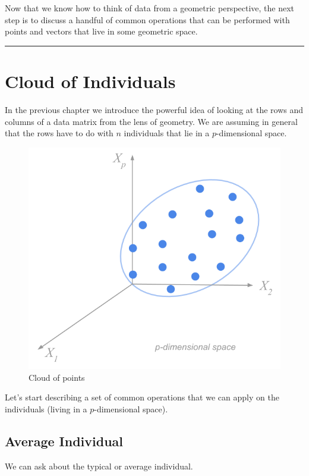 \documentclass[]{book}
\begin{document}
Now that we know how to think of data from a geometric perspective, the next
step is to discuss a handful of common operations that can be performed with
points and vectors that live in some geometric space.

\begin{center}\rule{0.5\linewidth}{\linethickness}\end{center}

\hypertarget{cloud-of-individuals}{%
\section{Cloud of Individuals}\label{cloud-of-individuals}}

In the previous chapter we introduce the powerful idea of looking at the
rows and columns of a data matrix from the lens of geometry.
We are assuming in general that the rows have to do with \(n\) individuals that
lie in a \(p\)-dimensional space.

\begin{figure}

{\centering \includegraphics[width=0.55\linewidth]{images/duality/cloud-obs-centering0} 

}

\caption{Cloud of points}\label{fig:unnamed-chunk-10}
\end{figure}

Let's start describing a set of common operations that we can apply on the individuals
(living in a \(p\)-dimensional space).

\hypertarget{average-individual}{%
\subsection{Average Individual}\label{average-individual}}

We can ask about the typical or average individual.
\end{document}
